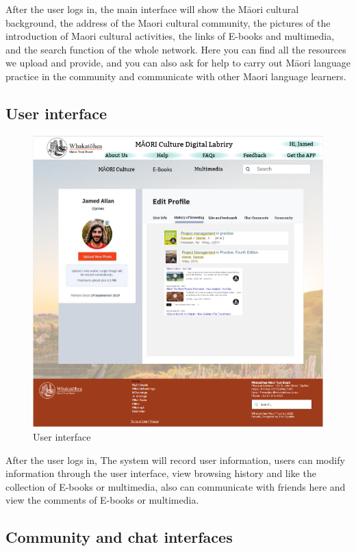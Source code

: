 After the user logs in, the main interface will show the Māori cultural background, the address of the Maori cultural community, the pictures of the introduction of Maori cultural activities, the links of E-books and multimedia, and the search function of the whole network. Here you can find all the resources we upload and provide, and you can also ask for help to carry out Māori language practice in the community and communicate with other Maori language learners.

\subsection{User interface}

\begin{figure}[htbp]
  \centerline{\includegraphics[width=400pt]{images/3-1-2.png}}
  \caption{User interface}
  \label{fig30}
\end{figure}

After the user logs in, The system will record user information, users can modify information through the user interface, view browsing history and like the collection of E-books or multimedia, also can communicate with friends here and view the comments of E-books or multimedia.

\subsection{Community and chat interfaces}

